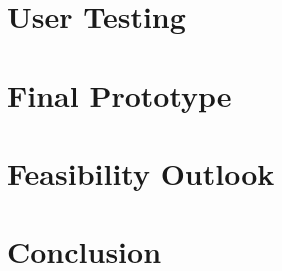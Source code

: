 \documentclass[runningheads]{llncs}
\begin{document}
\section{User Testing}

\section{Final Prototype}

\section{Feasibility Outlook}

\section{Conclusion}

%

\end{document}
